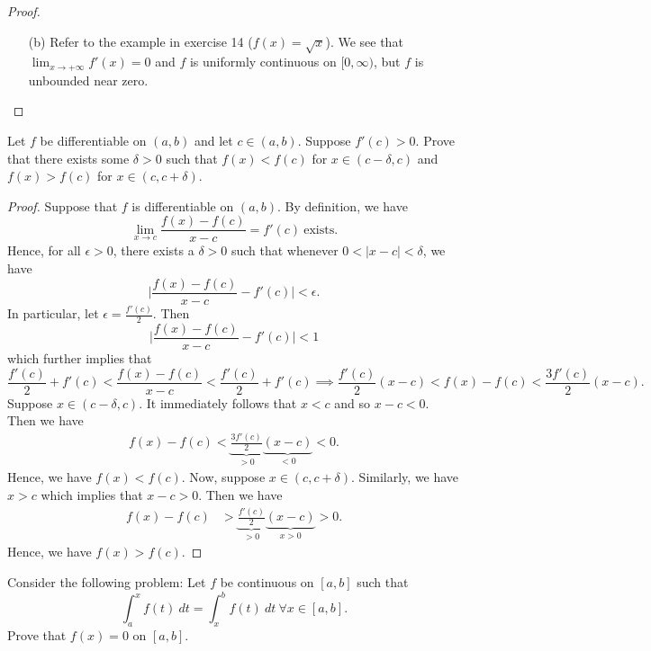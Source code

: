 \documentclass[a4paper]{article}
\begin{document}
\begin{proof}
\begin{enumerate}
\begin{enumerate}
            \item[(I)] Let \( x,y \in [0,R] \). Then suppose \( |  x- y  |  < \delta < {\delta}_{1} \). From (1), we can conclude that \( f \) is uniformly continuous.
            \item[(II)] Let \( x,y \in [R,+\infty) \). Then suppose \( | x- y  |  < \delta < {\delta}_{2} \). From (3), we can conclude that \( f  \) is uniformly continuous.
            \item[(III)] Let \( x \in [0,R] \) and \( y \in [R,+\infty) \). Then whenever \( |  x - y  | < \delta < 1  \), we can conclude that \( x,y \in [R-1, R+1] \). Then \( |  x- y  |  < \delta < {\delta}_{3} \) implies that 
                \[  | f(x) - f(y) |  < \epsilon. \]
                Hence, \( f  \) is uniformly continuous.
        \end{enumerate}
    \item[(b)] Refer to the example in exercise 14 (\( f(x) = \sqrt{ x }  \)). We see that \( \lim_{ x \to +\infty  } f'(x) = 0  \) and \( f  \) is uniformly continuous on \( [0,\infty) \), but \( f  \) is unbounded near zero. 
\end{enumerate}
\end{proof}

\begin{problem}
    Let \( f  \) be differentiable on \( (a,b) \) and let \( c \in (a,b) \). Suppose \( f'(c) > 0  \). Prove that there exists some \( \delta > 0  \) such that \( f(x) < f(c) \) for \( x \in (c - \delta, c) \) and \( f(x) > f(c) \) for \( x \in (c, c + \delta) \).
\end{problem}
\begin{proof}
Suppose that \( f  \) is differentiable on \( (a,b) \). By definition, we have 
\[  \lim_{ x \to c }  \frac{ f(x) - f(c) }{  x - c  } = f'(c)  \ \text{exists}. \]
Hence, for all \( \epsilon > 0  \), there exists a \( \delta > 0  \) such that whenever \( 0 < |  x - c  |  < \delta \), we have 
\[  \Big| \frac{ f(x) - f(c) }{ x - c  }  - f'(c) \Big| < \epsilon. \]
In particular, let \( \epsilon = \frac{ f'(c) }{ 2 }   \). Then  
\[  \Big| \frac{ f(x) - f(c) }{  x - c  }  - f'(c) \Big| < 1 \tag{*}  \]
which further implies that 
\[  \frac{ f'(c)   }{ 2 }  + f'(c) < \frac{ f(x) - f(c) }{ x - c  }  < \frac{ f'(c) }{ 2 }  + f'(c) \implies \frac{ f'(c)   }{ 2 } (x-c) < f(x) - f(c) < \frac{ 3 f'(c) }{ 2 }  (x - c).  \]
Suppose \( x \in (c-\delta, c) \). It immediately follows that \( x < c  \) and so \( x - c < 0  \). Then we have 
\begin{align*}
    f(x) - f(c) < \underbrace{\frac{ 3 f'(c) }{ 2  }}_{>0}  \underbrace{(x - c)}_{<0} 
                < 0.
\end{align*}
Hence, we have \( f(x) < f(c) \). Now, suppose \( x \in (c , c + \delta) \). Similarly, we have \( x > c  \) which implies that \( x - c > 0  \). Then we have 
\begin{align*}
    f(x) - f(c )&> \underbrace{\frac{ f'(c) }{ 2  }}_{>0}  \underbrace{(x - c)}_{x > 0} 
                > 0.
\end{align*}
Hence, we have \( f(x) > f(c) \).
\end{proof} 


Consider the following problem: Let \( f  \) be continuous on \( [a,b] \) such that  
\[  \int_{ a }^{ x } f(t) \ dt = \int_{ x }^{ b }  f(t)  \ dt \ \forall x \in [a,b].  \]
Prove that \( f(x) = 0  \) on \( [a,b] \).
\end{document}
